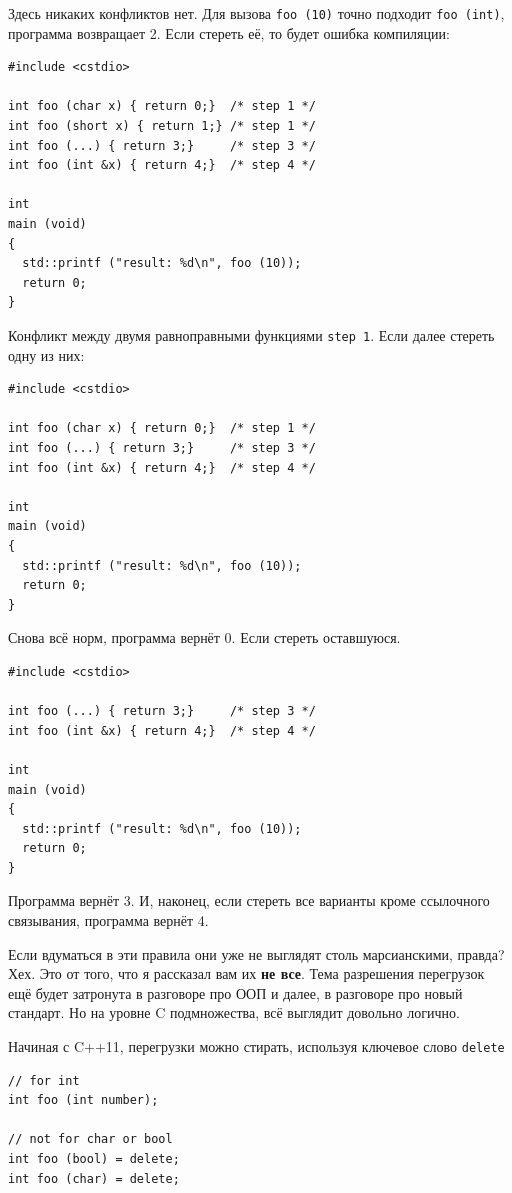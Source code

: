 \documentclass[a4paper,12pt,oneside]{article}
\begin{document}
Здесь никаких конфликтов нет. Для вызова \lstinline!foo (10)! точно подходит \lstinline!foo (int)!, программа возвращает 2.
Если стереть её, то будет ошибка компиляции:

\begin{lstlisting}
#include <cstdio>

int foo (char x) { return 0;}  /* step 1 */
int foo (short x) { return 1;} /* step 1 */
int foo (...) { return 3;}     /* step 3 */
int foo (int &x) { return 4;}  /* step 4 */

int
main (void)
{
  std::printf ("result: %d\n", foo (10));
  return 0;
}
\end{lstlisting}

Конфликт между двумя равноправными функциями \lstinline!step 1!. Если далее стереть одну из них:

\begin{lstlisting}
#include <cstdio>

int foo (char x) { return 0;}  /* step 1 */
int foo (...) { return 3;}     /* step 3 */
int foo (int &x) { return 4;}  /* step 4 */

int
main (void)
{
  std::printf ("result: %d\n", foo (10));
  return 0;
}
\end{lstlisting}

Снова всё норм, программа вернёт 0. Если стереть оставшуюся.

\begin{lstlisting}
#include <cstdio>

int foo (...) { return 3;}     /* step 3 */
int foo (int &x) { return 4;}  /* step 4 */

int
main (void)
{
  std::printf ("result: %d\n", foo (10));
  return 0;
}
\end{lstlisting}

Программа вернёт 3. И, наконец, если стереть все варианты кроме ссылочного связывания, программа вернёт 4.

Если вдуматься в эти правила они уже не выглядят столь марсианскими, правда? Хех. Это от того, что я рассказал вам их \textbf{не все}. Тема разрешения перегрузок ещё будет затронута в разговоре про ООП и далее, в разговоре про новый стандарт. Но на уровне C подмножества, всё выглядит довольно логично.

Начиная с C++11, перегрузки можно стирать, используя ключевое слово \lstinline!delete!

\begin{lstlisting}
// for int
int foo (int number);

// not for char or bool
int foo (bool) = delete;
int foo (char) = delete;
\end{lstlisting}
\end{document}

